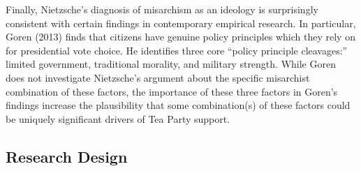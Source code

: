 \documentclass[12pt,]{article}
\begin{document}
Finally, Nietzsche's diagnosis of misarchism as an ideology is
surprisingly consistent with certain findings in contemporary empirical
research. In particular, Goren (2013) finds that citizens have genuine
policy principles which they rely on for presidential vote choice. He
identifies three core ``policy principle cleavages:'' limited
government, traditional morality, and military strength. While Goren
does not investigate Nietzsche's argument about the specific misarchist
combination of these factors, the importance of these three factors in
Goren's findings increase the plausibility that some combination(s) of
these factors could be uniquely significant drivers of Tea Party
support.

\subsection{Research Design}\label{research-design}
\end{document}
